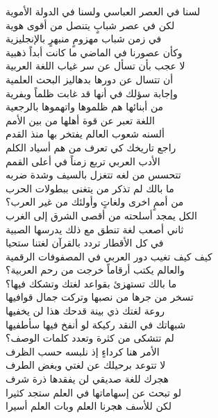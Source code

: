 \documentclass[letterpaper,12pt]{article}
\begin{document}
\begin{tcolorbox}[colback=boxcolor,colframe=headercolor,title=\textbf{Stanza 3},breakable]
\textarabic{
لسنا في العصر العباسي ولسنا في الدولة الأموية \\
لكن في عصر شبابٍ يتنصل من أقوى هوية \\
في زمن شباب مهزومٍ منبهرٍ بالإنجليزية \\
وكأن عصورنا في الماضي ما كانت أبداً ذهبية \\
لا عجب بأن تسأل عن سر غياب اللغة العربية \\
أن تتسال عن دورها بدهاليز البحث العلمية \\
وإجابة سؤلك في أنها قد غابت ظلماً وبفرية \\
من أبنائها هم ظلموها واتهموها بالرجعية \\
اللغة تعبر عن قوة أهلها من بين الأمم \\
ألسنه شعوب العالم يفتخر بها منذ القدم \\
راجع تاريخك كي تعرف من هم أسياد الكلم \\
الأدب العربي تربع زمناً في أعلى القمم \\
تتحسس من لغه تتغزل بالسيف وشدة ضربه \\
ما بالك لم تذكر من يتغنى ببطولات الحرب \\
من أممٍ اخرى ولغاتٍ وأولئك من غير العرب؟ \\
الكل يمجد أسلحته من أقصى الشرق إلى الغرب \\
ثاني أصعب لغة تنطق مع ذلك يدرسها الصبية \\
في كل الأقطار تردد بالقرآن لغتنا ستحيا \\
كيف كيف تغيب دور العربي في المصفوفات الرقمية \\
والعالم يكتب أرقاماً خرجت من رحم العربية؟ \\
ما بالك تستهزئ بقواعد لغتك وتشكك فيها؟ \\
تسخر من جرها من نصبها وتركت جمال قوافيها \\
روعة لغتك ذي بينة قدحك هذا لن يخفيها \\
شبهاتك في النقد ركيكة لو أنفخ فيها سأطفيها \\
لم تتشكى من كثرة وتعدد كلمات الوصف؟ \\
الأمر هنا كرداءٍ إذ نلبسه حسب الظرف \\
لا تتوعد برحيلك عن لغتي وبغض الطرف \\
هجرك للغة صديقي لن يفقدها ذرة شرف \\
لو تبحث عن إسهاماتها في العلم ستجد كثيرا \\
لكن للأسف هجرنا العلم وبات العلم أسيرا \\
}
\end{tcolorbox}
\end{document}
